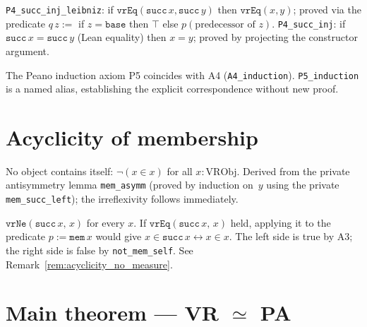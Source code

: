 \begin{theorem}
\label{thm:P4}
\leanok
{}
\texttt{P4\_succ\_inj\_leibniz}: if $\texttt{vrEq}(\texttt{succ}\,x,
\texttt{succ}\,y)$ then $\texttt{vrEq}(x, y)$; proved via the predicate
$q\,z := $ if $z = \texttt{base}$ then $\top$ else $p(\text{predecessor of }z)$.
\texttt{P4\_succ\_inj}: if $\texttt{succ}\,x = \texttt{succ}\,y$ (Lean
equality) then $x = y$; proved by projecting the constructor argument.
\end{theorem}

\begin{theorem}[P5 --- Induction]
\label{thm:P5}
\leanok
{}
The Peano induction axiom P5 coincides with A4 (\texttt{A4\_induction}).
\texttt{P5\_induction} is a named alias, establishing the explicit
correspondence without new proof.
\end{theorem}

\section{Acyclicity of membership}
\label{sec:vr_acyclicity}

\begin{theorem}
\label{thm:not_mem_self}
\leanok
{}
No object contains itself: $\lnot(x \in x)$ for all $x :
\mathrm{VRObj}$.  Derived from the private antisymmetry lemma
\texttt{mem\_asymm} (proved by induction on~$y$ using the private
\texttt{mem\_succ\_left}); the irreflexivity follows immediately.
\end{theorem}

\begin{theorem}[$t(x) \ne x$]
\label{thm:succ_ne_self}
\leanok
{}
$\texttt{vrNe}(\texttt{succ}\,x,\,x)$ for every $x$.  If $\texttt{vrEq}(\texttt{succ}\,x,\,x)$ held,
applying it to the predicate $p := \texttt{mem}\,x$ would give $x \in
\texttt{succ}\,x \leftrightarrow x \in x$.  The left side is true by A3;
the right side is false by \texttt{not\_mem\_self}.  See
Remark~\ref{rem:acyclicity_no_measure}.
\end{theorem}

\section{Main theorem --- VR $\simeq$ PA}
\label{sec:vr_T11}

